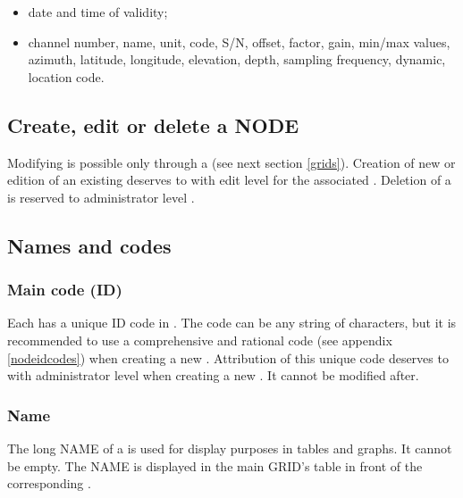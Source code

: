 \begin{itemize}
\item    date and time of validity;
\item    channel number, name, unit, code, S/N, offset, factor, gain, min/max values, azimuth, latitude, longitude, elevation, depth, sampling frequency, dynamic, location code.
\end{itemize}



\subsection{Create, edit or delete a NODE}

Modifying  is possible only through a  (see next section \ref{grids}). Creation of new  or edition of an existing  deserves to  with edit level for the associated . Deletion of a  is reserved to administrator level .


\subsection{Names and codes}

\subsubsection{Main code (ID)}

Each  has a unique ID code in \webobs. The code can be any string of characters, but it is recommended to use a comprehensive and rational code (see appendix \ref{nodeidcodes}) when creating a new . Attribution of this unique code deserves to  with administrator level when creating a new . It cannot be modified after.

\subsubsection{Name}

The long NAME of a  is used for display purposes in tables and graphs. It cannot be empty. The NAME is displayed in the main GRID's table in front of the corresponding .


